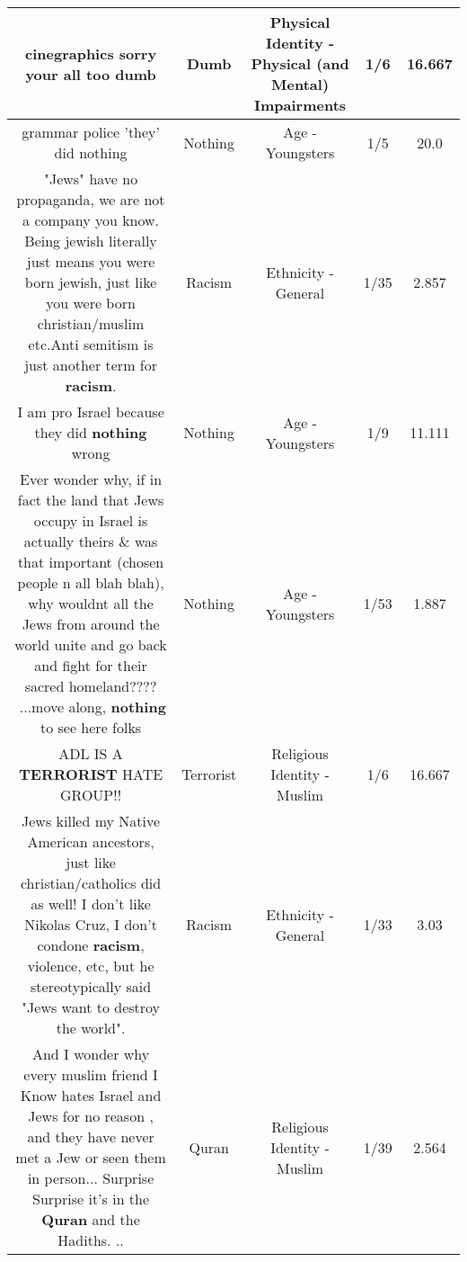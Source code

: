 \documentclass[11pt]{article}
\newlength\mylength
\begin{document}
\begin{center}
\begin{longtable}{|C{.65\mylength}|C{.30\mylength}|C{.12\mylength}|C{.12\mylength}|C{.12\mylength}|}
  \small cinegraphics sorry your all too dumb\normalsize   & Dumb & Physical Identity - Physical (and Mental) Impairments & 1/6 & 16.667 \\  \hline
  \small grammar police 'they' did nothing\normalsize   & Nothing & Age - Youngsters & 1/5 & 20.0 \\  \hline
  \small "Jews" have no propaganda, we are not a company you know. Being jewish literally just means you were born jewish, just like you were born christian/muslim etc.Anti semitism is just another term for \textbf{racism}.\normalsize   & Racism & Ethnicity - General & 1/35 & 2.857 \\  \hline
  \small I am pro Israel because they did \textbf{nothing} wrong\normalsize   & Nothing & Age - Youngsters & 1/9 & 11.111 \\  \hline
  \small Ever wonder why, if in fact the land that Jews occupy in Israel is actually theirs \& was that important (chosen people n all blah blah), why wouldnt all the Jews from around the world unite and go back and fight for their sacred homeland????  🤔...move along, \textbf{nothing} to see here folks\normalsize   & Nothing & Age - Youngsters & 1/53 & 1.887 \\  \hline
  \small ADL IS A \textbf{TERRORIST} HATE GROUP!!\normalsize   & Terrorist & Religious Identity - Muslim & 1/6 & 16.667 \\  \hline
  \small Jews killed my Native American ancestors, just like christian/catholics did as well! I don't like Nikolas Cruz, I don't condone \textbf{racism}, violence, etc, but he stereotypically said "Jews want to destroy the world".\normalsize   & Racism & Ethnicity - General & 1/33 & 3.03 \\  \hline
  \small And I wonder why every muslim friend I Know hates Israel and Jews for no reason , and they have never met a Jew or seen them in person... Surprise Surprise it's in the \textbf{Quran} and the Hadiths. ..\normalsize   & Quran & Religious Identity - Muslim & 1/39 & 2.564 \\  \hline

\end{longtable}
\end{center}
\end{document}
